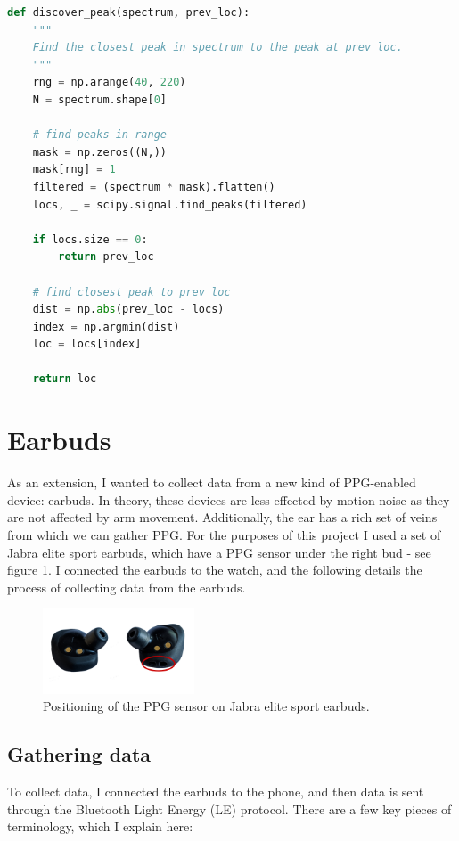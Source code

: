 \documentclass[12pt,a4paper,twoside,openright]{report}
\begin{document}
\begin{lstlisting}[language=Python]
def discover_peak(spectrum, prev_loc):
    """
    Find the closest peak in spectrum to the peak at prev_loc.
    """
    rng = np.arange(40, 220)
    N = spectrum.shape[0]

    # find peaks in range
    mask = np.zeros((N,))
    mask[rng] = 1
    filtered = (spectrum * mask).flatten()
    locs, _ = scipy.signal.find_peaks(filtered)

    if locs.size == 0:
        return prev_loc

    # find closest peak to prev_loc
    dist = np.abs(prev_loc - locs)
    index = np.argmin(dist)
    loc = locs[index]

    return loc
\end{lstlisting}

\section{Earbuds}

As an extension, I wanted to collect data from a new kind of PPG-enabled
device: earbuds. In theory, these devices are less effected by motion noise
as they are not affected by arm movement. Additionally, the ear has a rich set
of veins from which we can gather PPG. For the purposes of this project I used
a set of Jabra elite sport earbuds, which have a PPG sensor under the right
bud - see figure \ref{fig:jabra}. I connected the earbuds to the watch, and
the following details the process of collecting data from the earbuds.

\begin{figure}[tbh]
	\centerline{\includegraphics[width=0.4\textwidth]{figs/jabra.png}}
	\caption{Positioning of the PPG sensor on Jabra elite sport earbuds.}
	\label{fig:jabra}
\end{figure}

\subsection{Gathering data}

To collect data, I connected the earbuds to the phone, and then data is
sent through the Bluetooth Light Energy (LE) protocol. There are a few key
pieces of terminology, which I explain here:
\end{document}
